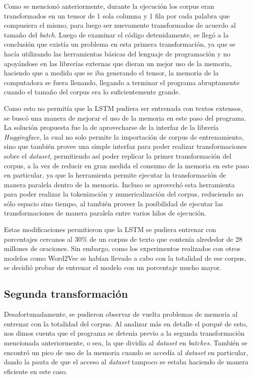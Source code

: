 Como se mencionó anteriormente, durante la ejecución los corpus eran transformados en un tensor de 1 sola columna y 1 fila por cada palabra que compusiera el mismo, para luego ser nuevamente transformados de acuerdo al tamaño del \textit{batch}. Luego de examinar el código detenidamente, se llegó a la conclusión que existía un problema en esta primera transformación, ya que se hacía utilizando las herramientas básicas del lenguaje de programación y no apoyándose en las librerías externas que dieran un mejor uso de la memoria, haciendo que a medida que se iba generando el tensor, la memoria de la computadora se fuera llenando, llegando a terminar el programa abruptamente cuando el tamaño del corpus era lo suficientemente grande.

Como esto no permitía que la LSTM pudiera ser entrenada con textos extensos, se buscó una manera de mejorar el uso de la memoria en este paso del programa. La solución propuesta fue la de aprovecharse de la interfaz de la librería \textit{Huggingface}, la cual no solo permite la importación de corpus de entrenamiento, sino que también provee una simple interfaz para poder realizar transformaciones sobre el \textit{dataset}, permitiendo así poder replicar la primer transformación del corpus, a la vez de reducir en gran medida el consumo de la memoria en este paso en particular, ya que la herramienta permite ejecutar la transformación de manera paralela dentro de la memoria. Incluso se aprovechó esta herramienta para poder realizar la tokenización y numericalización del corpus, reduciendo no sólo espacio sino tiempo, al también proveer la posibilidad de ejecutar las transformaciones de manera paralela entre varios hilos de ejecución.

Estas modificaciones permitieron que la LSTM se pudiera entrenar con porcentajes cercanos al 30\% de un corpus de texto que contenía alrededor de 28 millones de oraciones. Sin embargo, como los experimentos realizados con otros modelos como Word2Vec se habían llevado a cabo con la totalidad de ese corpus, se decidió probar de entrenar el modelo con un porcentaje mucho mayor.

\subsection{Segunda transformación}

Desafortunadamente, se pudieron observar de vuelta problemas de memoria al entrenar con la totalidad del corpus. Al analizar más en detalle el porqué de esto, nos dimos cuenta que el programa se detenía previo a la segunda transformación mencionada anteriormente, o sea, la que dividía al \textit{dataset} en \textit{batches}. También se encontró un pico de uso de la memoria cuando se accedía al \textit{dataset} en particular, dando la pauta de que el acceso al \textit{dataset} tampoco se estaba haciendo de manera eficiente en este caso.

